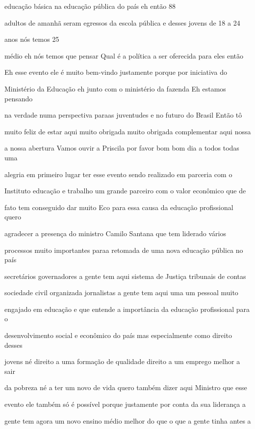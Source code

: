\documentclass[a4paper,12pt]{article}
\begin{document}
educação básica na educação pública do país eh então 88%

adultos de amanhã seram egressos da escola pública e desses jovens de 18 a 24

anos nós temos 25%

médio eh nós temos que pensar Qual é a política a ser oferecida para eles então

Eh esse evento ele é muito bem-vindo justamente porque por iniciativa do

Ministério da Educação eh junto com o ministério da fazenda Eh estamos pensando

na verdade numa perspectiva paraas juventudes e no futuro do Brasil Então tô

muito feliz de estar aqui muito obrigada muito obrigada complementar aqui nossa

a nossa abertura Vamos ouvir a Priscila por favor bom bom dia a todos todas uma

alegria em primeiro lugar ter esse evento sendo realizado em parceria com o

Instituto educação e trabalho um grande parceiro com o valor econômico que de

fato tem conseguido dar muito Eco para essa causa da educação profissional quero

agradecer a presença do ministro Camilo Santana que tem liderado vários

processos muito importantes paraa retomada de uma nova educação pública no país

secretários governadores a gente tem aqui sistema de Justiça tribunais de contas

sociedade civil organizada jornalistas a gente tem aqui uma um pessoal muito

engajado em educação e que entende a importância da educação profissional para o

desenvolvimento social e econômico do país mas especialmente como direito desses

jovens né direito a uma formação de qualidade direito a um emprego melhor a sair

da pobreza né a ter um novo de vida quero também dizer aqui Ministro que esse

evento ele também só é possível porque justamente por conta da sua liderança a

gente tem agora um novo ensino médio melhor do que o que a gente tinha antes a
\end{document}
